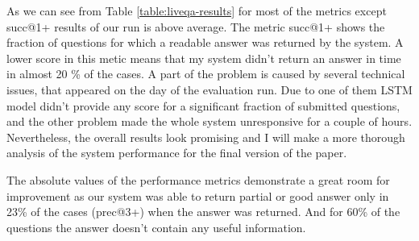 \documentclass[]{article}
\begin{document}
As we can see from Table \ref{table:liveqa-results} for most of the metrics except succ@1+ results of our run is above average.
The metric succ@1+ shows the fraction of questions for which a readable answer was returned by the system.
A lower score in this metic means that my system didn't return an answer in time in almost 20 \% of the cases.
A part of the problem is caused by several technical issues, that appeared on the day of the evaluation run.
Due to one of them LSTM model didn't provide any score for a significant fraction of submitted questions, and the other problem made the whole system unresponsive for a couple of hours.
Nevertheless, the overall results look promising and I will make a more thorough analysis of the system performance for the final version of the paper.

The absolute values of the performance metrics demonstrate a great room for improvement as our system was able to return partial or good answer only in 23\% of the cases (prec@3+) when the answer was returned.
And for 60\% of the questions the answer doesn't contain any useful information.





\end{document}
